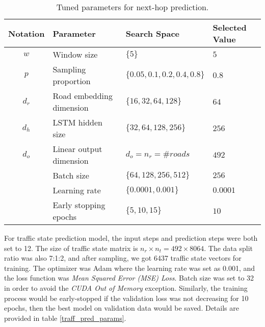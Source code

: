 \begin{table}[htb]
    \begin{center}
        \caption{Tuned parameters for next-hop prediction.}
        \label{next-hop_params}
        \begin{tabular}{clll}
            \toprule
  
            \textbf{Notation} & \textbf{Parameter} & \textbf{Search Space} & \textbf{Selected Value}\\
  
            \midrule
  
            $w$ & Window size & $\{5 \}$ & $5$\\
            $p$ & Sampling proportion & $\{0.05, 0.1, 0.2, 0.4, 0.8\}$ & $0.8$\\
            $d_r$ & Road embedding dimension & $\{16, 32, 64, 128 \}$ & $64$\\
            $d_h$ & LSTM hidden size & $\{32, 64, 128, 256 \}$ & $256$\\
            $d_o$ & Linear output dimension & $d_o=n_r=\#roads$ & $492$\\
            ~ & Batch size & $\{64, 128, 256, 512 \}$ & $256$\\
            ~ & Learning rate & $\{0.0001, 0.001\}$ & $0.0001$\\
            ~ & Early stopping epochs & $\{5, 10, 15\}$ & $10$\\
  
            \bottomrule
        \end{tabular}
    \end{center}
\end{table}

For traffic state prediction model, the input steps and prediction steps were both set to 12. The size of traffic state matrix is $n_r\times n_t=492\times 8064$. The data split ratio was also 7:1:2, and after sampling, we got 6437 traffic state vectors for training. The optimizer was Adam where the learning rate was set as 0.001, and the loss function was \textit{Mean Squared Error (MSE) Loss}. Batch size was set to 32 in order to avoid the \textit{CUDA Out of Memory} exception. Similarly, the training process would be early-stopped if the validation loss was not decreasing for 10 epochs, then the best model on validation data would be saved. Details are provided in table \ref{traff_pred_params}.

